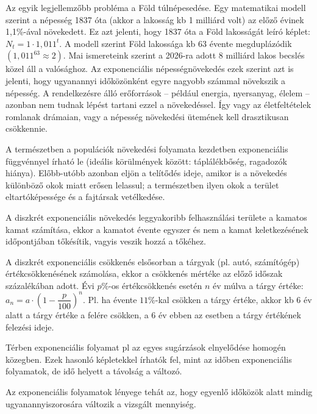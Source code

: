 \documentclass[12pt,a4paper]{article}
\begin{document}
Az egyik legjellemzőbb probléma a Föld túlnépesedése. Egy matematikai modell szerint a népesség 1837 óta (akkor a lakosság kb 1 milliárd volt) az előző évinek 1,1\%-ával növekedett. Ez azt jelenti, hogy 1837 óta a Föld lakosságát leíró képlet: $N_t=1\cdot 1,011^t$. A modell szerint Föld lakossága kb 63 évente megduplázódik $(1,011^{63} \approx 2)$. Mai ismereteink szerint a 2026-ra adott 8 milliárd lakos becslés közel áll a valósághoz. Az exponenciális népességnövekedés ezek szerint azt is jelenti, hogy ugyanannyi időközönként egyre nagyobb számmal növekszik a népesség. A rendelkezésre álló erőforrások – például energia, nyersanyag, élelem – azonban nem tudnak lépést tartani ezzel a növekedéssel. Így vagy az életfeltételek romlanak drámaian, vagy a népesség növekedési ütemének kell drasztikusan csökkennie.

A természetben a populációk növekedési folyamata kezdetben exponenciális függvénnyel írható le (ideális körülmények között: táplálékbőség, ragadozók hiánya). Előbb-utóbb azonban eljön a telítődés ideje, amikor is a növekedés különböző okok miatt erősen lelassul; a természetben ilyen okok a terület eltartóképessége és a fajtársak vetélkedése.

A diszkrét exponenciális növekedés leggyakoribb felhasználási területe a kamatos kamat számítása, ekkor a kamatot évente egyszer és nem a kamat keletkezésének időpontjában tőkésítik, vagyis veszik hozzá a tőkéhez.

A diszkrét exponenciális csökkenés elsősorban a tárgyak (pl. autó, számítógép) értékcsökkenésének számolása, ekkor a csökkenés mértéke az előző időszak százalékában adott. Évi $p\%$-os értékcsökkenés esetén $n$ év múlva a tárgy értéke: $a_n=a\cdot\left(1-\dfrac{p}{100} \right)^n$. Pl. ha évente $11\%$-kal csökken a tárgy értéke, akkor kb 6 év alatt a tárgy értéke a felére csökken, a 6 év ebben az esetben a tárgy értékének felezési ideje.

Térben exponenciális folyamat pl az egyes sugárzások elnyelődése homogén közegben. Ezek hasonló képletekkel írhatók fel, mint az időben exponenciális folyamatok, de idő helyett a távolság a változó.

Az exponenciális folyamatok lényege tehát az, hogy egyenlő időközök alatt mindig ugyanannyiszorosára változik a vizsgált mennyiség.
\newpage
\end{document}
